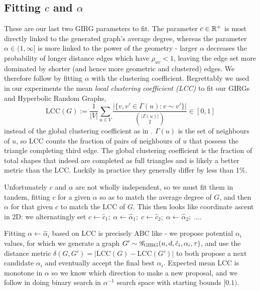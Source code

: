 \subsection{Fitting $c$ and $\alpha$}
These are our last two GIRG parameters to fit.
The parameter $c \in \mathbb{R}^+$ is most directly linked to the generated graph's average degree, whereas the parameter $\alpha \in (1, \infty]$ is more linked to the power of the geometry - larger $\alpha$ decreases the probability of longer distance edges which have $\rho_{uv} < 1$, leaving the edge set more dominated by shorter (and hence more geometric and clustered) edges. We therefore follow \cite{blasius2018towards} by fitting $\alpha$ with the clustering coefficient. Regrettably we used in our experiments the mean \textit{local clustering coefficient (LCC)} to fit our GIRGs and Hyperbolic Random Graphs, 
\begin{equation}
    \mathrm{LCC}(G) := \frac{1}{|V|} \sum_{u \in V} 
    \frac{| \{ v, v' \in \Gamma(u): v \sim v'\} |}{{|\Gamma(u)| \choose 2}} \in [0, 1]
\end{equation}
instead of the global clustering coefficient as in \cite{blasius2018towards}. $\Gamma(u)$ is the set of neighbours of $u$, so LCC counts the fraction of pairs of neighbours of $u$ that possess the triangle completing third edge. The global clustering coefficient is the fraction of total  shapes that indeed are completed as full triangles and is likely a better metric than the LCC. Luckily in practice they generally differ by less than 1\%.

Unfortunately $c$ and $\alpha$ are not wholly independent, so we must fit them in tandem, fitting $c$ for a given $\alpha$ so as to match the average degree of $G$, and then $\alpha$ for that given $c$ to match the LCC of $G$. This then looks like coordinate ascent in 2D: we alternatingly set $c \gets \hat{c}_1;\; \alpha \gets \hat{\alpha}_1;\; c \gets \hat{c}_2;\; \alpha \gets \hat{\alpha}_2;\; ...$.

Fitting $\alpha \gets \hat{\alpha}_i$ based on LCC is precisely ABC like - we propose potential $\alpha_i$ values, for which we generate a graph $G' \sim \mathscr{G}_{\mathrm{GIRG}}(n, d, \hat{c}_i, \alpha_i, \tau)$, and use the distance metric $\delta(G, G') = |\mathrm{LCC}(G) - \mathrm{LCC}(G')|$ to both propose a next candidate $\alpha_i$ and eventually accept the final best $\hat{\alpha}_i$. Expected mean LCC is monotone in $\alpha$ so we know which direction to make a new proposal, and we follow \cite{blasius2018towards} in doing binary search in $\alpha^{-1}$ search space with starting bounds $[0. 1)$.

